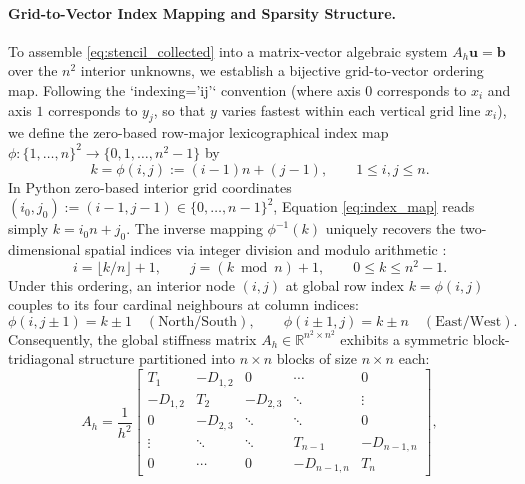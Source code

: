 \documentclass[11pt,a4paper]{article}
\theoremstyle{definition}
\theoremstyle{remark}
\begin{document}
\paragraph{Grid-to-Vector Index Mapping and Sparsity Structure.}
To assemble \eqref{eq:stencil_collected} into a matrix-vector algebraic system $A_h \bm{u} = \bm{b}$ over the $n^2$ interior unknowns, we establish a bijective grid-to-vector ordering map. Following the `indexing='ij'` convention (where axis $0$ corresponds to $x_i$ and axis $1$ corresponds to $y_j$, so that $y$ varies fastest within each vertical grid line $x_i$), we define the zero-based row-major lexicographical index map $\phi: \{1,\dots,n\}^2 \to \{0,1,\dots,n^2-1\}$ by
\begin{equation}
	k = \phi(i,j) := (i-1)n + (j-1), \qquad 1 \le i,j \le n.
	\label{eq:index_map}
\end{equation}
In Python zero-based interior grid coordinates $(i_0, j_0) := (i-1, j-1) \in \{0,\dots,n-1\}^2$, Equation \eqref{eq:index_map} reads simply $k = i_0 n + j_0$. The inverse mapping $\phi^{-1}(k)$ uniquely recovers the two-dimensional spatial indices via integer division and modulo arithmetic \cite{quarteroni2017}:
\begin{equation}
	i = \lfloor k / n \rfloor + 1, \qquad j = (k \bmod n) + 1, \qquad 0 \le k \le n^2 - 1.
	\label{eq:inverse_map}
\end{equation}
Under this ordering, an interior node $(i,j)$ at global row index $k = \phi(i,j)$ couples to its four cardinal neighbours at column indices:
\begin{equation}
	\phi(i, j\pm 1) = k \pm 1 \quad (\text{North/South}), \qquad \phi(i\pm 1, j) = k \pm n \quad (\text{East/West}).
	\label{eq:neighbour_offsets}
\end{equation}
Consequently, the global stiffness matrix $A_h \in \mathbb{R}^{n^2 \times n^2}$ exhibits a symmetric block-tridiagonal structure partitioned into $n \times n$ blocks of size $n \times n$ each:
\begin{equation}
	A_h = \frac{1}{h^2}
	\begin{bmatrix}
		T_1 & -D_{1,2} & 0 & \cdots & 0 \\
		-D_{1,2} & T_2 & -D_{2,3} & \ddots & \vdots \\
		0 & -D_{2,3} & \ddots & \ddots & 0 \\
		\vdots & \ddots & \ddots & T_{n-1} & -D_{n-1,n} \\
		0 & \cdots & 0 & -D_{n-1,n} & T_n
	\end{bmatrix},
	\label{eq:block_tridiag}
\end{equation}
\end{document}
